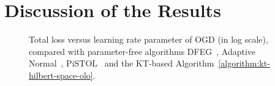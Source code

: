 \section{Discussion of the Results}
\label{section:discussion}

\begin{figure}[t]
\centering
{}
\caption{\footnotesize{Total loss versus learning rate parameter of \ac{OGD} (in log scale), compared with parameter-free algorithms DFEG~\cite{Orabona-2013}, Adaptive Normal~\cite{McMahan-Orabona-2014}, PiSTOL~\cite{Orabona-2014} and the KT-based Algorithm~\ref{algorithm:kt-hilbert-space-olo}.}}
\label{fig:exp_olo}
\end{figure}

